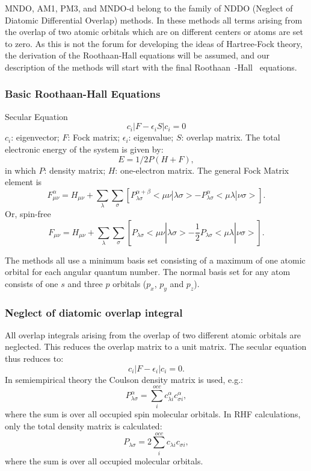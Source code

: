 MNDO, AM1, PM3, and MNDO-d belong to the family of NDDO (Neglect of Diatomic
Differential Overlap) methods.  In these
methods all terms arising from the overlap of two atomic orbitals which are on
different centers or atoms are set to zero. As this is not the forum for
developing the ideas of Hartree-Fock theory, the derivation of the
Roothaan-Hall equations will be assumed, and our description of the methods
will start with the final Roothaan~\cite{roothaan}-Hall~\cite{hall} equations.

\subsubsection{Basic Roothaan-Hall Equations}
Secular Equation
$$
c_i|F-\epsilon_iS|c_i =0
$$
$c_i$: eigenvector; $F$: Fock matrix; $\epsilon_i$: eigenvalue; $S$: overlap matrix.
The total electronic  energy of the system is given by:
$$
E = 1/2P(H+F),
$$
in which $P$: density matrix; $H$: one-electron matrix.
The general Fock Matrix element is
$$
F_{\mu\nu}^{\alpha} = H_{\mu\nu}+\sum_{\lambda}\sum_{\sigma}
[P_{\lambda\sigma}^{\alpha+\beta}<\mu\nu|\lambda\sigma> - P_{\lambda\sigma}^{\alpha}
<\mu\lambda|\nu\sigma>].
$$
Or, spin-free
$$
F_{\mu\nu} = H_{\mu\nu}+\sum_{\lambda}\sum_{\sigma}
[P_{\lambda\sigma}<\mu\nu|\lambda\sigma> - \frac{1}{2}P_{\lambda\sigma}
<\mu\lambda|\nu\sigma>].
$$

The methods all use a minimum basis set consisting of a maximum of one atomic
orbital for each angular quantum number. The normal basis set for any atom
consists of one $s$ and three $p$ orbitals ($p_x$, $p_y$ and $p_z$).

\subsubsection{Neglect of diatomic overlap integral}
All overlap integrals arising from the overlap of two  different atomic orbitals are neglected.
This reduces the overlap matrix to a unit matrix. The secular equation thus
reduces to:
$$
c_i|F-\epsilon_i|c_i =0.
$$
In semiempirical theory the Coulson \label{ndoi} density matrix is used, e.g.:
$$
P_{\lambda\sigma}^{\alpha} = \sum_i^{occ}c_{\lambda i}^{\alpha}c_{\sigma  i}^{\alpha},
$$
where the sum is over all occupied spin molecular orbitals.
In RHF calculations, only the total density matrix is calculated:
$$
     P_{\lambda\sigma} = 2\sum_i^{occ}c_{\lambda i}c_{\sigma  i},
$$
where the sum is over all occupied  molecular orbitals.

